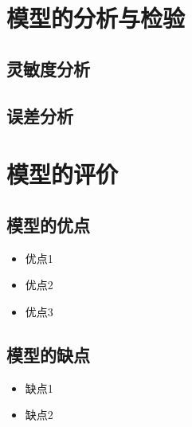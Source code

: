 \documentclass[withoutpreface,bwprint]{cumcmthesis}
\begin{document}

\section{模型的分析与检验}

\subsection{灵敏度分析}

\subsection{误差分析}


\section{模型的评价}

\subsection{模型的优点}
\begin{itemize}[itemindent=2em]
\item 优点1 
\item 优点2
\item 优点3
\end{itemize}

\subsection{模型的缺点}
\begin{itemize}[itemindent=2em]
\item 缺点1
\item 缺点2
\end{itemize}
\newpage
\nocite{*}
\end{document}
